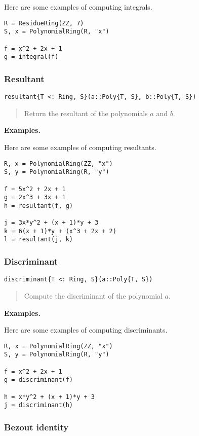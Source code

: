 \documentclass[a4paper,10pt]{article}
\newcommand{\desc}[1]{\vspace{-3mm}\begin{quote}#1\end{quote}}
\begin{document}
{{Here are some examples of computing integrals.

\begin{lstlisting}
R = ResidueRing(ZZ, 7)
S, x = PolynomialRing(R, "x")

f = x^2 + 2x + 1
g = integral(f)
\end{lstlisting}

\subsubsection{Resultant}

\begin{lstlisting}
resultant{T <: Ring, S}(a::Poly{T, S}, b::Poly{T, S})
\end{lstlisting}

\desc{Return the resultant of the polynomials $a$ and $b$.}

\textbf{Examples.}

Here are some examples of computing resultants.

\begin{lstlisting}
R, x = PolynomialRing(ZZ, "x")
S, y = PolynomialRing(R, "y")

f = 5x^2 + 2x + 1
g = 2x^3 + 3x + 1
h = resultant(f, g)

j = 3x*y^2 + (x + 1)*y + 3
k = 6(x + 1)*y + (x^3 + 2x + 2)
l = resultant(j, k)
\end{lstlisting}

\subsubsection{Discriminant}

\begin{lstlisting}
discriminant{T <: Ring, S}(a::Poly{T, S})
\end{lstlisting}

\desc{Compute the discriminant of the polynomial $a$.}

\textbf{Examples.}

Here are some examples of computing discriminants.

\begin{lstlisting}
R, x = PolynomialRing(ZZ, "x")
S, y = PolynomialRing(R, "y")

f = x^2 + 2x + 1
g = discriminant(f)

h = x*y^2 + (x + 1)*y + 3
j = discriminant(h)
\end{lstlisting}

\subsubsection{Bezout identity}

}}
\end{document}
